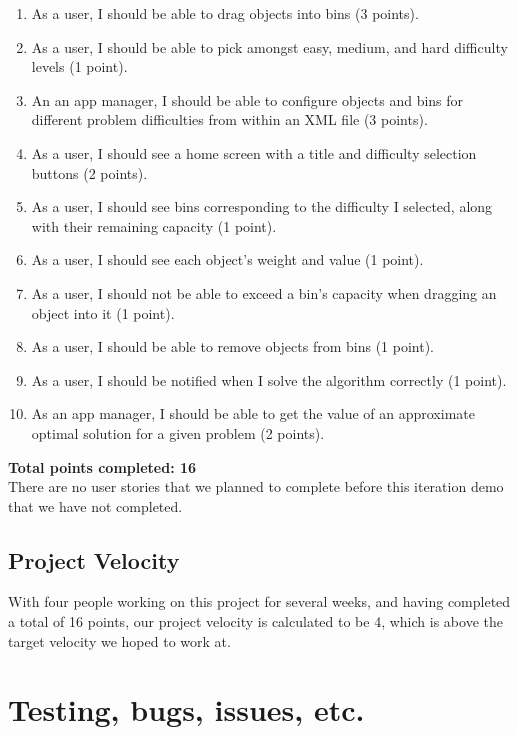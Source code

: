 \documentclass[11pt]{article}
\begin{document}
\begin{enumerate}

\item As a user, I should be able to drag objects into bins (3 points).
\item As a user, I should be able to pick amongst easy, medium, and hard
difficulty levels (1 point).
\item An an app manager, I should be able to configure objects and bins for
different problem difficulties from within an XML file (3 points).
\item As a user, I should see a home screen with a title and difficulty
selection buttons (2 points).
\item As a user, I should see bins corresponding to the difficulty I selected,
along with their remaining capacity (1 point).
\item As a user, I should see each object's weight and value (1 point).
\item As a user, I should not be able to exceed a bin's capacity when dragging
an object into it (1 point).
\item As a user, I should be able to remove objects from bins (1 point).
\item As a user, I should be notified when I solve the algorithm correctly
(1 point).
\item As an app manager, I should be able to get the value of an approximate
optimal solution for a given problem (2 points).

\end{enumerate}

\textbf{Total points completed:  16} \\

There are no user stories that we planned to complete before this iteration demo
that we have not completed.

\subsection{Project Velocity}

With four people working on this project for several weeks, and having completed
a total of 16 points, our project velocity is calculated to be 4, which is above
the target velocity we hoped to work at.

\section{Testing, bugs, issues, etc.}
\end{document}
